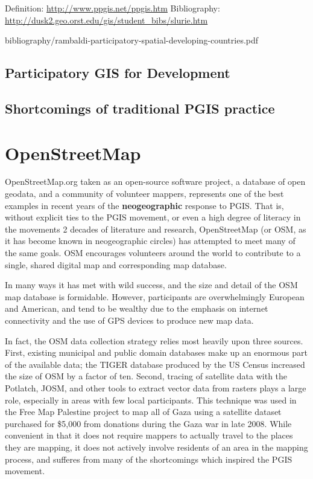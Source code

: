 \documentclass[11pt]{report}
\begin{document}
Definition: \url{http://www.ppgis.net/ppgis.htm}
Bibliography: \url{http://dusk2.geo.orst.edu/gis/student_bibs/slurie.htm}


bibliography/rambaldi-participatory-spatial-developing-countries.pdf

\subsection{Participatory GIS for Development}
\subsection{Shortcomings of traditional PGIS practice}
\section{OpenStreetMap}

OpenStreetMap.org taken as an open-source software project, a database of open geodata, and a community of volunteer mappers, represents one of the best examples in recent years of the \textbf{neogeographic} response to PGIS. That is, without explicit ties to the PGIS movement, or even a high degree of literacy in the movements 2 decades of literature and research, OpenStreetMap (or OSM, as it has become known in neogeographic circles) has attempted to meet many of the same goals. OSM encourages volunteers around the world to contribute to a single, shared digital map and corresponding map database. 

In many ways it has met with wild success, and the size and detail of the OSM map database is formidable. 
However, participants are overwhelmingly European and American, and tend to be wealthy due to the emphasis on internet connectivity and the use of GPS devices to produce new map data.

In fact, the OSM data collection strategy relies most heavily upon three sources. First, existing municipal and public domain databases make up an enormous part of the available data; the TIGER database produced by the US Census increased the size of OSM by a factor of ten. Second, tracing of satellite data with the Potlatch, JOSM, and other tools to extract vector data from rasters plays a large role, especially in areas with few local participants. This technique was used in the Free Map Palestine project to map all of Gaza using a satellite dataset purchased for \$5,000 from donations during the Gaza war in late 2008. \cite{maron2010openstreetmap} While convenient in that it does not require mappers to actually travel to the places they are mapping, it does not actively involve residents of an area in the mapping process, and sufferes from many of the shortcomings which inspired the PGIS movement. 
\end{document}

